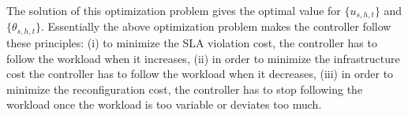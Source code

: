  The solution of this optimization problem gives the optimal value for $\{u_{s,h,t}\}$ and
 $\{\theta_{s,h,t}\}$. 
Essentially the above optimization problem makes the controller follow these principles:
 (i) to minimize the SLA violation cost, the controller has to follow the workload when it increases,
   (ii) in order to minimize the infrastructure cost the controller has to follow the workload when it decreases,
   (iii) in order to minimize the reconfiguration cost, the controller has to stop following the workload once the workload is too variable or deviates too much.  

